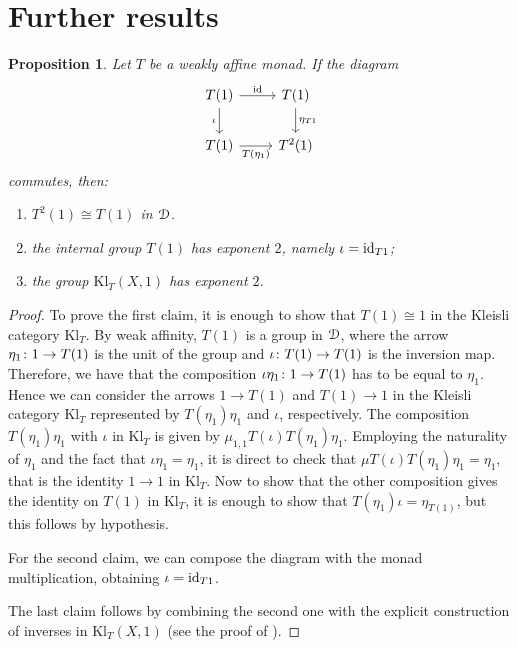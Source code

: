 \documentclass[a4paper,UKenglish,numberwithinsect,cleveref, autoref, thm-restate]{lipics-v2021}
\theoremstyle{plain} %
\newtheorem{myproposition}[mytheorem]{Proposition}
\theoremstyle{definition} %
\begin{document}
\section{Further results}


\begin{myproposition}
Let $T$ be a weakly affine monad. If the diagram
\[\begin{tikzcd}
	{T(1)} & {T(1)} \\
	{T(1)} & {T^2(1)}
	\arrow["\iota"', from=1-1, to=2-1]
	\arrow["{T(\eta_1)}"', from=2-1, to=2-2]
	\arrow["\id",from=1-1, to=1-2]
	\arrow["{\eta_{T1}}", from=1-2, to=2-2]
\end{tikzcd}\]
commutes, then:
\begin{enumerate}
	\item $T^2(1)\cong T(1)$ in $\mD$. 
	\item the internal group $T(1)$ has exponent $2$, namely $\iota=\id_{T1}$;
	\item the group $\mathrm{Kl}_T(X,1)$ has exponent $2$.
\end{enumerate}
\end{myproposition}

 
\begin{proof}
	To prove the first claim, it is enough to show that $T(1)\cong 1$ in the Kleisli category $\mathrm{Kl}_T$.
	By weak affinity, $T(1)$ is a group in $\mD$, where the arrow $\freccia{1}{\eta_1}{T(1)}$ is the unit of the group and $\freccia{T(1)}{\iota}{T(1)}$ is the inversion map. Therefore, we have that the composition $\freccia{1}{\iota\eta_1}{T(1)}$ has to be equal to $\eta_1$.
	Hence we can consider the arrows $1\to T(1)$ and $T(1)\to 1$ in the Kleisli category $\mathrm{Kl}_T$ represented by $T(\eta_1)\eta_1$ and $\iota$, respectively. The composition $T(\eta_1)\eta_1$ with $\iota$ in $\mathrm{Kl}_T$ is given by $\mu_{1,1}T(\iota)T(\eta_1)\eta_1$. Employing the naturality of $\eta_1$ and the fact that $\iota\eta_1=\eta_1$, it is direct to check that $\mu T(\iota)T(\eta_1)\eta_1=\eta_1$, that is the identity $1\to 1$ in $\mathrm{Kl}_T$. Now to show that the other composition gives the identity on $T(1)$ in $\mathrm{Kl}_T$, it is enough to show that $T(\eta_1)\iota=\eta_{T(1)}$, but this follows by hypothesis.

	For the second claim, we can compose the diagram with the monad multiplication, obtaining $\iota=\id_{T1}$.
	
	The last claim follows by combining the second one with the explicit construction of inverses in $\mathrm{Kl}_T(X,1)$ (see the proof of ).
\end{proof}
\end{document}
